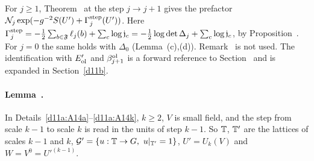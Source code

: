 \begin{detail}\label{d11a:A13}
For $j\ge1$, Theorem~ at the step $j\to j+1$ gives the prefactor $\mathcal N_j\exp(-g^{-2}S(U')+\Gamma^{\rm step}_j(U'))$. Here $\Gamma^{\rm step}_j=-\frac12\sum_{b\in\mathfrak F}\ell_j(b)+\sum_c\log\mathfrak j_c=-\frac12\log\det\Delta_j+\sum_c\log\mathfrak j_c$, by Proposition~. For $j=0$ the same holds with $\Delta_0$ (Lemma~(c),(d)). Remark~ is not used. The identification with $E'_{\rm ol}$ and $\beta^{\rm ol}_{j+1}$ is a forward reference to Section~ and is expanded in Section~\ref{d11b}.
\end{detail}

\paragraph{Lemma~.} In Details~\ref{d11a:A14a}--\ref{d11a:A14k}, $k\ge2$, $V$ is small field, and the step from scale $k-1$ to scale $k$ is read in the units of step $k-1$. So $\mathbb T$, $\mathbb T'$ are the lattices of scales $k-1$ and $k$, $\mathcal G'=\{u:\T\to G,\ u|_{\T'}=1\}$, $U'=U_k(V)$ and $W=V^0=U'^{(k-1)}$.

